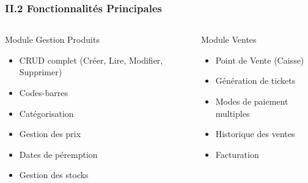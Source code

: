 \documentclass[11pt, aspectratio=169]{beamer}
\begin{document}
\begin{frame}
    \frametitle{II.2 Fonctionnalités Principales}
    
    \begin{columns}[T]
        \begin{block}{Module Gestion Produits}
            \begin{itemize}
                \item[\faBox] CRUD complet (Créer, Lire, Modifier, Supprimer)
                \item[\faBarcode] Codes-barres
                \item[\faList] Catégorisation
                \item[\faPricetag] Gestion des prix
                \item[\faCalendar] Dates de péremption
                \item[\faWarehouse] Gestion des stocks
            \end{itemize}
        \end{block}
        
        \begin{block}{Module Ventes}
            \begin{itemize}
                \item[\faCashRegister] Point de Vente (Caisse)
                \item[\faTicketAlt] Génération de tickets
                \item[\faMoneyBillWave] Modes de paiement multiples
                \item[\faChartLine] Historique des ventes
                \item[\faFileInvoice] Facturation
            \end{itemize}
        \end{block}
    \end{columns}
\end{frame}
\end{document}
